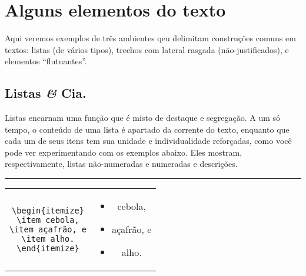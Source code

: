 \section{Alguns elementos do texto}

Aqui veremos exemplos de três ambientes qeu delimitam construções
comuns em textos: listas (de vários tipos), trechos com lateral
rasgada (não-justificados), e elementos ``flutuantes''.

\subsection[Listas]{Listas {\it \&} Cia.}

Listas encarnam uma função que é misto de destaque e segregação. A um
só tempo, o conteúdo de uma lista é apartado da corrente do texto,
enquanto que cada um de seus itens tem sua unidade e individualidade
reforçadas, como você pode ver experimentando com os exemplos abaixo.
Eles mostram, respectivamente, listas
não-numeradas e
numeradas e descrições.

\begin{center}\footnotesize\hrule\smallskip
\begin{tabular}{cc}
\begin{minipage}{.465\textwidth}
\begin{verbatim}
\begin{itemize}
\item cebola,
\item açafrão, e
\item alho.
\end{itemize}
\end{verbatim}
\end{minipage} &
\begin{minipage}{.465\textwidth}
\begin{itemize}
\item cebola,
\item açafrão, e
\item alho.
\end{itemize}
\end{minipage}
\end{tabular}
\smallskip
\end{center}

